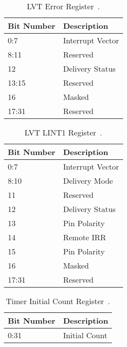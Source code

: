 \begin{table}[H]
  \centering
  \begin{tabularx}{1.0\textwidth}{| X | X |}
    \hline
    \textbf{Bit Number} & \textbf{Description} \\ \hline\hline
    0:7                 & Interrupt Vector     \\ \hline
    8:11                & Reserved             \\ \hline
    12                  & Delivery Status      \\ \hline
    13:15               & Reserved             \\ \hline
    16                  & Masked               \\ \hline
    17:31               & Reserved             \\ \hline
  \end{tabularx}
  \caption{LVT Error Register~\autocite[sec.~3.11.5.1]{ia32}.}
  \label{tab:lapicregslvterr}
\end{table}

\begin{table}[H]
  \centering
  \begin{tabularx}{1.0\textwidth}{| X | X |}
    \hline
    \textbf{Bit Number} & \textbf{Description} \\ \hline\hline
    0:7                 & Interrupt Vector     \\ \hline
    8:10                & Delivery Mode        \\ \hline
    11                  & Reserved             \\ \hline
    12                  & Delivery Status      \\ \hline
    13                  & Pin Polarity         \\ \hline
    14                  & Remote IRR           \\ \hline
    15                  & Pin Polarity         \\ \hline
    16                  & Masked               \\ \hline
    17:31               & Reserved             \\ \hline
  \end{tabularx}
  \caption{LVT LINT1 Register~\autocite[sec.~3.11.5.1]{ia32}.}
  \label{tab:lapicregslvtlint}
\end{table}

\begin{table}[H]
  \centering
  \begin{tabularx}{1.0\textwidth}{| X | X |}
    \hline
    \textbf{Bit Number} & \textbf{Description} \\ \hline\hline
    0:31                & Initial Count        \\ \hline
  \end{tabularx}
  \caption{Timer Initial Count Register~\autocite[sec.~3.11.5.4]{ia32}.}
  \label{tab:lapicregstimerinit}
\end{table}

